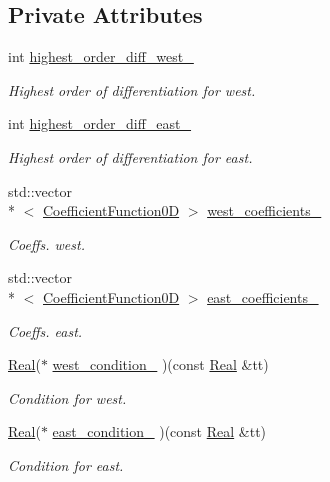 \subsection*{Private Attributes}
\begin{DoxyCompactItemize}
\item 
int \hyperlink{classmtk_1_1RobinBCDescriptor1D_ab8d5accf2e2c2fae79865a5b8d11c3c5}{highest\+\_\+order\+\_\+diff\+\_\+west\+\_\+}
\begin{DoxyCompactList}\small\item\em Highest order of differentiation for west. \end{DoxyCompactList}\item 
int \hyperlink{classmtk_1_1RobinBCDescriptor1D_a7a1e3660c59b132ddf576c36adf7dd37}{highest\+\_\+order\+\_\+diff\+\_\+east\+\_\+}
\begin{DoxyCompactList}\small\item\em Highest order of differentiation for east. \end{DoxyCompactList}\item 
std\+::vector\\*
$<$ \hyperlink{group__c07-mim__ops_ga04276745b4d511f0f3c636d6e0df7c2d}{Coefficient\+Function0\+D} $>$ \hyperlink{classmtk_1_1RobinBCDescriptor1D_a0a8a0dc4fa2dab02a9992094a3f5d0d6}{west\+\_\+coefficients\+\_\+}
\begin{DoxyCompactList}\small\item\em Coeffs. west. \end{DoxyCompactList}\item 
std\+::vector\\*
$<$ \hyperlink{group__c07-mim__ops_ga04276745b4d511f0f3c636d6e0df7c2d}{Coefficient\+Function0\+D} $>$ \hyperlink{classmtk_1_1RobinBCDescriptor1D_aa8f5350e1767174f92fda449b44d1b04}{east\+\_\+coefficients\+\_\+}
\begin{DoxyCompactList}\small\item\em Coeffs. east. \end{DoxyCompactList}\item 
\hyperlink{group__c01-roots_gac080bbbf5cbb5502c9f00405f894857d}{Real}($\ast$ \hyperlink{classmtk_1_1RobinBCDescriptor1D_ab4e2dd2c68d33d8fc82ba697d515ebd2}{west\+\_\+condition\+\_\+} )(const \hyperlink{group__c01-roots_gac080bbbf5cbb5502c9f00405f894857d}{Real} \&tt)
\begin{DoxyCompactList}\small\item\em Condition for west. \end{DoxyCompactList}\item 
\hyperlink{group__c01-roots_gac080bbbf5cbb5502c9f00405f894857d}{Real}($\ast$ \hyperlink{classmtk_1_1RobinBCDescriptor1D_adecf9da4390869d2aa49ccb1307320d6}{east\+\_\+condition\+\_\+} )(const \hyperlink{group__c01-roots_gac080bbbf5cbb5502c9f00405f894857d}{Real} \&tt)
\begin{DoxyCompactList}\small\item\em Condition for east. \end{DoxyCompactList}\end{DoxyCompactItemize}


